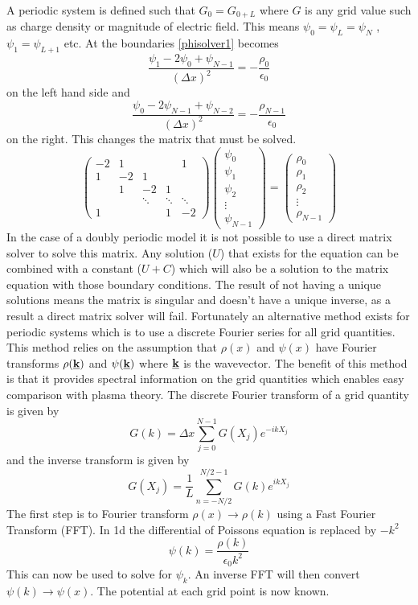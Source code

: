\documentclass[12pt]{article}
\def\be{\begin{equation}}
\def\ee{\end{equation}}
\begin{document}
A periodic system is defined such that $G_0 = G_{0+L}$ where $G$ is any grid value such as charge density or magnitude of electric field. This means $\psi_0 = \psi_L = \psi_N$ , $\psi_1 = \psi_{L+1}$ etc. At the boundaries \eqref{phisolver1} becomes 
\be 
\frac{\psi_1 - 2\psi_0 + \psi_{N-1}}{(\Delta x)^2} = - \frac{\rho_0}{\epsilon_0}
\ee
on the left hand side and 
\be 
\frac{\psi_0 - 2\psi_{N-1} + \psi_{N-2}}{(\Delta x)^2} = - \frac{\rho_{N-1}}{\epsilon_0}
\ee
on the right. This changes the matrix that must be solved. 
\be
\begin{pmatrix}
  -2 & 1 & & & 1  \\
  1 & -2 & 1 \\
        & 1 & -2 & 1   \\
        & & \ddots & \ddots & \ddots \\
        1 & & & 1 & -2
\end{pmatrix}
\begin{pmatrix} 
 \psi_0  \\ 
 \psi_1  \\ 
 \psi_2  \\ 
 \vdots  \\
 \psi_{N-1}
\end{pmatrix}
= 
\begin{pmatrix} 
 \rho_0  \\ 
 \rho_1 \\ 
 \rho_2  \\ 
 \vdots  \\
 \rho_{N-1}
\end{pmatrix}
\ee
In the case of a doubly periodic model it is not possible to use a direct matrix solver to solve this matrix. Any solution ($U$) that exists for the equation  can be combined with a constant ($U+C$) which will also be a solution to the matrix equation with those boundary conditions. The result of not having a unique solutions means the matrix is singular and doesn't have a unique inverse, as a result a direct matrix solver will fail. Fortunately an alternative method exists for periodic systems which is to use a discrete Fourier series for all grid quantities. This method relies on the assumption that $\rho(x)$ and $\psi(x)$ have Fourier transforms $\rho(\underline{\bold{k}})$ and $\psi(\underline{\bold{k}})$ where $\underline{\bold{k}}$ is the wavevector. The benefit of this method is that it provides spectral information on the grid quantities which enables easy comparison with plasma theory. The discrete Fourier transform of a grid quantity is given by 
\be 
G(k) = \Delta x \sum\limits_{j=0}^{N-1} G(X_j)e^{-ikX_j}
\ee 
and the inverse transform is given by 
\be 
G(X_j) = \frac{1}{L} \sum\limits_{n=-N/2}^{N/2-1} G(k) e^{ikX_j}
\ee 
The first step is to Fourier transform $\rho(x) \rightarrow \rho(k)$ using a Fast Fourier Transform (FFT). In 1d the differential of Poissons equation is replaced by $-k^2$ 
\be 
\psi(k) = \frac{\rho(k)}{\epsilon_0 k^2}
\ee 
This can now be used to solve for $\psi_k$. An inverse FFT will then convert  $\psi(k) \rightarrow \psi(x)$. The potential at each grid point is now known.
\end{document}
